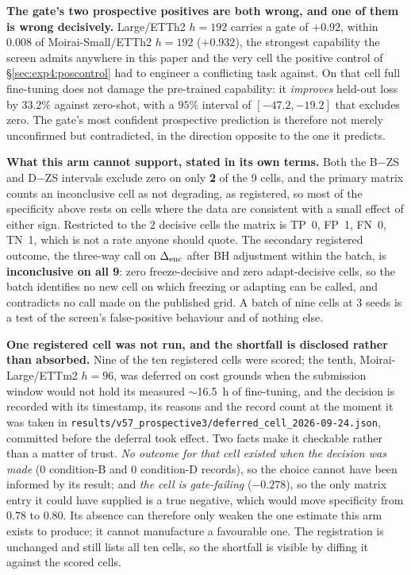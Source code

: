 \textbf{The gate's two prospective positives are both wrong, and one of them is
wrong decisively.}  Large/ETTh2 $h{=}192$ carries a gate of $+0.92$, within
$0.008$ of Moirai-Small/ETTh2 $h{=}192$ ($+0.932$), the strongest capability the
screen admits anywhere in this paper and the very cell the positive control of
\S\ref{sec:exp4:poscontrol} had to engineer a conflicting task against.  On that
cell full fine-tuning does not damage the pre-trained capability: it
\emph{improves} held-out loss by $33.2\%$ against zero-shot, with a $95\%$
interval of $[-47.2, -19.2]$ that excludes zero.  The gate's most confident
prospective prediction is therefore not merely unconfirmed but contradicted, in
the direction opposite to the one it predicts.

\textbf{What this arm cannot support, stated in its own terms.}  Both the B$-$ZS
and D$-$ZS intervals exclude zero on only \textbf{2} of the 9 cells, and the
primary matrix counts an inconclusive cell as not degrading, as registered, so
most of the specificity above rests on cells where the data are consistent with a
small effect of either sign.  Restricted to the 2 decisive cells the matrix is
TP~0, FP~1, FN~0, TN~1, which is not a rate anyone should quote.  The secondary
registered outcome, the three-way call on $\Delta_\text{enc}$ after BH adjustment within the
batch, is \textbf{inconclusive on all 9}: zero freeze-decisive and zero
adapt-decisive cells, so the batch identifies no new cell on which freezing or
adapting can be called, and contradicts no call made on the published grid.  A
batch of nine cells at 3 seeds is a test of the
screen's false-positive behaviour and of nothing else.

\textbf{One registered cell was not run, and the shortfall is disclosed rather
than absorbed.}  Nine of the ten registered cells were scored; the tenth,
Moirai-Large/ETTm2 $h{=}96$, was deferred on cost grounds when the submission
window would not hold its measured $\sim$16.5~h of fine-tuning, and the decision
is recorded with its timestamp, its reasons and the record count at the moment it
was taken in \texttt{results/v57\_prospective3/deferred\_cell\_2026-09-24.json},
committed before the deferral took effect.  Two facts make it checkable rather
than a matter of trust.  \emph{No outcome for that cell existed when the decision
was made} (0 condition-B and 0 condition-D records), so the choice cannot have
been informed by its result; and \emph{the cell is gate-failing} ($-0.278$), so
the only matrix entry it could have supplied is a true negative, which would move
specificity from $0.78$ to $0.80$.  Its absence can therefore only weaken the one
estimate this arm exists to produce; it cannot manufacture a favourable one.  The
registration is unchanged and still lists all ten cells, so the shortfall is
visible by diffing it against the scored cells.

